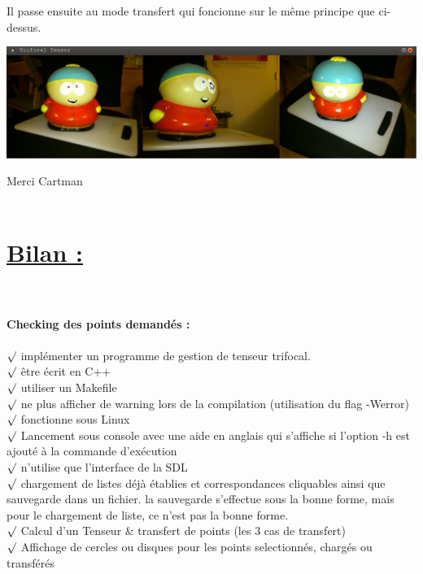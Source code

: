 \documentclass[a4paper,11pt,fleqn]{report}
\begin{document}
	Il passe ensuite au mode transfert qui foncionne sur le m\^eme principe que ci-dessus.
	\begin{center}\includegraphics[scale=0.50]{./cartman2.png}\end{center}Merci Cartman\\\\
	\section{\underline{Bilan :}}
	\\\\
	\textbf{Checking des points demand\'es :}\\\\
	$\surd$ impl\'ementer un programme de gestion de tenseur trifocal.\\
	$\surd$ \^etre \'ecrit en C++\\
	$\surd$ utiliser un Makefile\\
	$\surd$ ne plus afficher de warning lors de la compilation (utilisation du flag -Werror)\\
	$\surd$ fonctionne sous Linux\\
	$\surd$ Lancement sous console avec une aide en anglais qui s'affiche si l'option -h est ajout\'e \`a la commande d'ex\'ecution\\
	$\surd$ n'utilise que l'interface de la SDL\\
	$\surd$ chargement de listes d\'ej\`a \'etablies et correspondances cliquables ainsi que sauvegarde dans un fichier. la sauvegarde s'effectue sous la bonne forme, mais pour le chargement de liste, ce n'est pas la bonne forme.\\
	$\surd$ Calcul d'un Tenseur & transfert de points (les 3 cas de transfert)\\
	$\surd$ Affichage de cercles ou disques pour les points selectionn\'es, charg\'es ou transf\'er\'es\\
		
\end{document}
